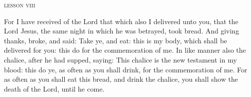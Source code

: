 \bigskip\bigskip
\mylessonsize
\begin{center}{\textsc{lesson viii}}\end{center}
{For I have received of the Lord that which also I delivered unto you, that the Lord Jesus, the same night in which he was betrayed, took bread.
And giving thanks, broke, and said: Take ye, and eat: this is my body, which shall be delivered for you: this do for the commemoration of me.
In like manner also the chalice, after he had supped, saying: This chalice is the new testament in my blood: this do ye, as often as you shall drink, for the commemoration of me.
For as often as you shall eat this bread, and drink the chalice, you shall show the death of the Lord, until he come.}

\bigskip\bigskip

